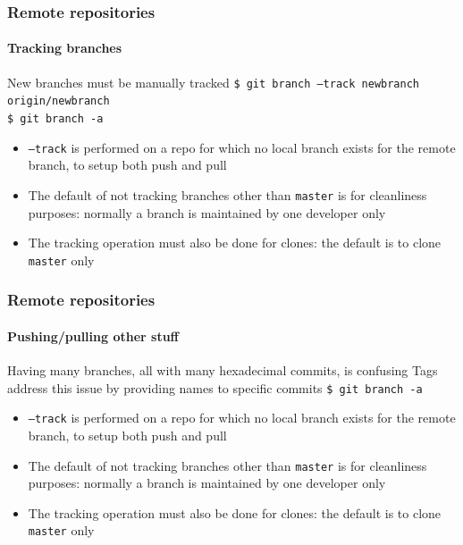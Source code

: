 \begin{frame}
\frametitle{Remote repositories}
\framesubtitle{Tracking branches}

\begin{block}{New branches must be manually tracked}
\texttt{\$ git branch ---track newbranch origin/newbranch} \\
\texttt{\$ git branch -a} \\

\begin{itemize}
\item \texttt{---track} is performed on a repo for which no local branch exists for the remote branch, to setup both push and pull
\item The default of not tracking branches other than \texttt{master} is for cleanliness purposes: normally a branch is maintained by one developer only
\item The tracking operation must also be done for clones: the default is to clone \texttt{master} only
\end{itemize}
\end{block}

\end{frame}

\begin{frame}
\frametitle{Remote repositories}
\framesubtitle{Pushing/pulling other stuff}

\begin{block}{Having many branches, all with many hexadecimal commits, is confusing}
Tags address this issue by providing names to specific commits
\texttt{\$ git branch -a} \\

\begin{itemize}
\item \texttt{---track} is performed on a repo for which no local branch exists for the remote branch, to setup both push and pull
\item The default of not tracking branches other than \texttt{master} is for cleanliness purposes: normally a branch is maintained by one developer only
\item The tracking operation must also be done for clones: the default is to clone \texttt{master} only
\end{itemize}
\end{block}

\end{frame}
